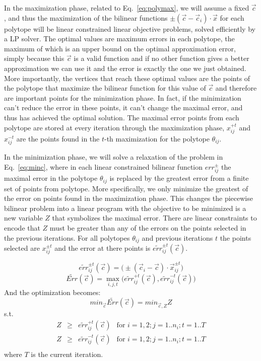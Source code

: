 In the maximization phase, related to Eq.~\ref{eq:polymax}, we will assume a fixed $\vec{c}$, and thus the maximization of the bilinear functions $\pm(\vec{c} - \vec{c}_i)\cdot \vec{x}$ for each polytope will be linear constrained linear objective problems, solved efficiently by a LP solver. The optimal values are maximum errors in each polytope, the maximum of which is an upper bound on the optimal approximation error, simply because this $\vec{c}$ is a valid function and if no other function gives a better approximation we can use it and the error is exactly the one we just obtained. More importantly, the vertices that reach these optimal values are the points of the polytope that maximize the bilinear function for this value of $\vec{c}$ and therefore are important points for the minimization phase. In fact, if the minimization can't reduce the error in these points, it can't change the maximal error, and thus has achieved the optimal solution. The maximal error points from each polytope are stored at every iteration through the maximization phase, $x^{+t}_{ij}$ and $x^{-t}_{ij}$ are the points found in the $t$-th maximization for the polytope $\theta_{ij}$. 

In the minimization phase, we will solve a relaxation of the problem in Eq.~\ref{eq:minc}, where in each linear constrained bilinear function $err^{\pm}_{ij}$ the maximal error in the polytope $\theta_{ij}$ is replaced by the greatest error from a finite set of points from polytope. More specifically, we only minimize the greatest of the error on points found in the maximization phase. This changes the piecewise bilinear problem into a linear program with the objective to be minimized is a new variable $Z$ that symbolizes the maximal error. There are linear constraints to encode that $Z$ must be greater than any of the errors on the points selected in the previous iterations. For all polytopes $\theta_{ij}$ and previous iterations $t$ the points selected are $x^{\pm t}_{ij}$ and the error at there points is $\tilde{err}_{ij}^{\pm t}(\vec{c})$.

$$ \tilde{err}_{ij}^{\pm t} (\vec{c}) = \big( \pm (\vec{c}_i - \vec{c})\cdot \vec{x}_{ij}^{\pm t} \big)$$
$$ \tilde{Err}(\vec{c}) =\max_{i,j,t} \big( \tilde{err}^{+t}_{ij} (\vec{c}), \tilde{err}^{-t}_{ij} (\vec{c}) \big)$$
And the optimization becomes:
$$min_{\vec{c}}\tilde{Err}({\vec{c}}) = min_{{\vec{c}},Z}  Z $$
s.t. 
$$
	\begin{array}{llll}
		Z & \geq & \tilde{err}_{ij}^{+t} (\vec{c}) & \mbox{for } i=1,2; j = 1..n_i; t=1..T\\
		Z & \geq & \tilde{err}_{ij}^{-t} (\vec{c}) & \mbox{for } i=1,2; j = 1..n_i; t=1..T\\
	\end{array}
$$
where $T$ is the current iteration.

